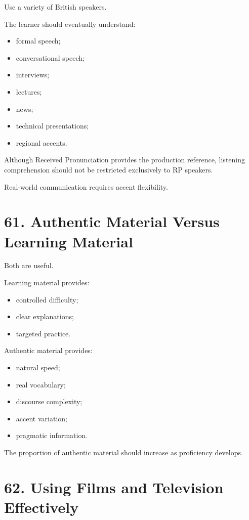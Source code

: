 Use a variety of British speakers.

The learner should eventually understand:

\begin{itemize}
    \item formal speech;
    \item conversational speech;
    \item interviews;
    \item lectures;
    \item news;
    \item technical presentations;
    \item regional accents.
\end{itemize}

Although Received Pronunciation provides the production reference, listening comprehension should not be restricted exclusively to RP speakers.

Real-world communication requires accent flexibility.

\section*{61. Authentic Material Versus Learning Material}

Both are useful.

Learning material provides:

\begin{itemize}
    \item controlled difficulty;
    \item clear explanations;
    \item targeted practice.
\end{itemize}

Authentic material provides:

\begin{itemize}
    \item natural speed;
    \item real vocabulary;
    \item discourse complexity;
    \item accent variation;
    \item pragmatic information.
\end{itemize}

The proportion of authentic material should increase as proficiency develops.

\section*{62. Using Films and Television Effectively}

